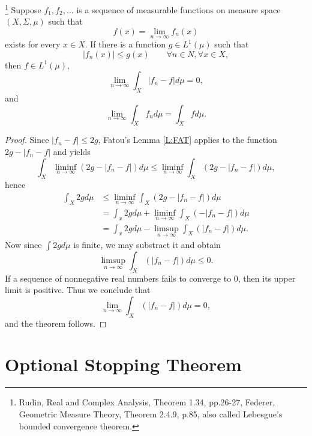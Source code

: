 \begin{theorem} \label{T:DOM}
\footnote{Rudin, Real and Complex Analysis, Theorem 1.34, pp.26-27,
  Federer, Geometric Measure Theory, Theorem 2.4.9, p.85, also
  called Lebesgue's bounded convergence theorem.}
Suppose $f_1,f_2,\dots$ is a sequence of measurable functions on 
measure space $(X,\Sigma,\mu)$ such that
\[
  f(x) = \lim_{n\to\infty} f_n(x)
\]
exists for every $x\in X$. If there is a function $g\in L^1(\mu)$ such that
\[
  |f_n(x)| \le g(x) \qquad \forall n\in N, \forall x\in X,
\]
then $f\in L^1(\mu)$, 
\begin{equation}
  \lim_{n\to\infty} \int_X |f_n -f| d\mu = 0,
\end{equation}
and
\begin{equation}
  \lim_{n\to\infty} \int_X f_n d\mu = \int_X f d\mu.
\end{equation}
\end{theorem}
\begin{proof}
Since $|f_n-f|\le 2g$, Fatou's Lemma \ref{L:FAT} applies to the function
$2g-|f_n-f|$ and yields
\[
  \int_X \liminf_{n\to\infty} (2g-|f_n-f|) d\mu 
   \le \liminf_{n\to\infty} \int_X (2g-|f_n-f|) d\mu,
\]
hence
\begin{align*}
  \int_X 2g d\mu
    &\le \liminf_{n\to\infty} \int_X (2g-|f_n-f|) d\mu  \\
    &= \int_x 2g d\mu + \liminf_{n\to\infty} \int_X (-|f_n-f|) d\mu  \\
    &= \int_x 2g d\mu - \limsup_{n\to\infty} \int_X (|f_n-f|) d\mu.  
\end{align*}
Now since $\int 2g d\mu$ is finite, we may substract it and obtain
\[
  \limsup_{n\to\infty} \int_X (|f_n-f|) d\mu \le 0.
\]
If a sequence of nonnegative real numbers fails to converge to $0$, then its
upper limit is positive. Thus we conclude that
\[
  \lim_{n\to\infty} \int_X (|f_n-f|) d\mu = 0,
\]
and the theorem follows.
\end{proof}



\section{Optional Stopping Theorem}

